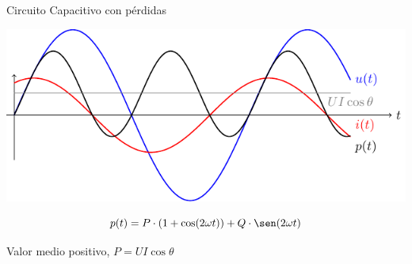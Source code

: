 \documentclass[aspectratio=169, usenames,svgnames,dvipsnames]{beamer}
\begin{document}
\begin{frame}[label={sec:org41859d8}]{Circuito Capacitivo con pérdidas}
\begin{center}
\includegraphics[height=0.5\textheight]{../figs/capacitivoPotencia.pdf}
\end{center}

\[
     p(t) = P \cdot (1 + \cos(2\omega t)) + Q \cdot \sen(2\omega t)
\]

\begin{center}
Valor medio positivo, \(P = U I \cos \theta\)
\end{center}
\end{frame}
\end{document}
